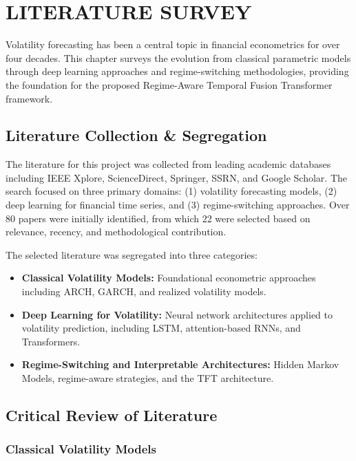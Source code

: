 \chapter{LITERATURE SURVEY}
\label{ChapterLiteratureSurvey}

Volatility forecasting has been a central topic in financial econometrics for over four decades. This chapter surveys the evolution from classical parametric models through deep learning approaches and regime-switching methodologies, providing the foundation for the proposed Regime-Aware Temporal Fusion Transformer framework.

\section{Literature Collection \& Segregation}

The literature for this project was collected from leading academic databases including IEEE Xplore, ScienceDirect, Springer, SSRN, and Google Scholar. The search focused on three primary domains: (1) volatility forecasting models, (2) deep learning for financial time series, and (3) regime-switching approaches. Over 80 papers were initially identified, from which 22 were selected based on relevance, recency, and methodological contribution.

The selected literature was segregated into three categories:
\begin{itemize}
    \item \textbf{Classical Volatility Models:} Foundational econometric approaches including ARCH, GARCH, and realized volatility models.
    \item \textbf{Deep Learning for Volatility:} Neural network architectures applied to volatility prediction, including LSTM, attention-based RNNs, and Transformers.
    \item \textbf{Regime-Switching and Interpretable Architectures:} Hidden Markov Models, regime-aware strategies, and the TFT architecture.
\end{itemize}

\section{Critical Review of Literature}

\subsection{Classical Volatility Models}

